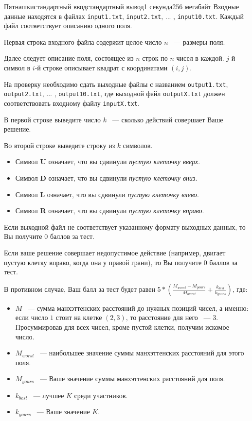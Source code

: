 \begin{problem}{Пятнашки}{стандартный ввод}{стандартный вывод}{1 секунда}{256 мегабайт}
\InputFile
Входные данные находятся в файлах \texttt{input1.txt}, \texttt{input2.txt}, ... , \texttt{input10.txt}. Каждый файл соответствует описанию одного поля.

Первая строка входного файла содержит целое число $n$ ~--- размеры поля.

Далее следует описание поля, состоящее из $n$ строк по $n$ чисел в каждой. $j$-й символ в $i$-й строке описывает квадрат с координатами $(i,j)$.

\OutputFile
На проверку необходимо сдать выходные файлы с названием \texttt{output1.txt}, \texttt{output2.txt}, ... , \texttt{output10.txt}, где выходной файл \texttt{outputX.txt} должен соответствовать входному файлу \texttt{inputX.txt}.

В первой строке выведите число $k$ ~--- сколько действий совершает Ваше решение.

Во второй строке выведите строку из $k$ символов.
\begin{itemize}
\item Символ \textbf{U} означает, что вы сдвинули \textit{пустую клеточку вверх}.
\item Символ \textbf{D} означает, что вы сдвинули \textit{пустую клеточку вниз}.
\item Символ \textbf{L} означает, что вы сдвинули \textit{пустую клеточку влево}.
\item Символ \textbf{R} означает, что вы сдвинули \textit{пустую клеточку вправо}.
\end{itemize}

\Scoring
Если выходной файл не соответствует указанному формату выходных данных, то Вы получите $0$ баллов за тест.

Если ваше решение совершает недопустимое действие (например, двигает пустую клетку вправо, когда она у правой грани), то Вы получите $0$ баллов за тест.


В противном случае, Ваш балл за тест будет равен $5*(\frac{M_{worst}-M_{yours}}{M_{worst}}+\frac{k_{best}}{k_{yours}})$, где:
\begin{itemize}
\item $M$ ~--- сумма манхэттенских расстояний до нужных позиций чисел, а именно: если число $1$ стоит на клетке $(2,3)$, то расстояние для него ~--- $3$. Просуммировав для всех чисел, кроме пустой клетки, получим искомое число.
\item $M_{worst}$ ~--- наибольшее значение суммы манхэттенских расстояний для этого поля.
\item $M_{yours}$ ~--- Ваше значение суммы манхэттенских расстояний для поля.
\item $k_{best}$ ~--- лучшее $K$ среди участников.
\item $k_{yours}$ ~--- Ваше значение $K$.
\end{itemize}


\end{problem}

